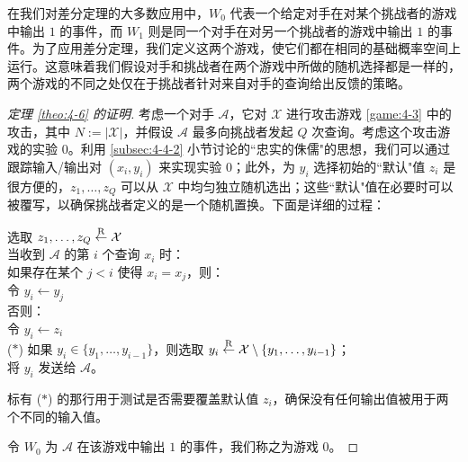 在我们对差分定理的大多数应用中，$W_0$ 代表一个给定对手在对某个挑战者的游戏中输出 $1$ 的事件，而 $W_1$ 则是同一个对手在对另一个挑战者的游戏中输出 $1$ 的事件。为了应用差分定理，我们定义这两个游戏，使它们都在相同的基础概率空间上运行。这意味着我们假设对手和挑战者在两个游戏中所做的随机选择都是一样的，两个游戏的不同之处仅在于挑战者针对来自对手的查询给出反馈的策略。

\begin{proof}[定理 \ref{theo:4-6} 的证明]
考虑一个对手 $\mathcal{A}$，它对 $\mathcal{X}$ 进行攻击游戏 \ref{game:4-3} 中的攻击，其中 $N:=|\mathcal{X}|$，并假设 $\mathcal{A}$ 最多向挑战者发起 $Q$ 次查询。考虑这个攻击游戏的实验 $0$。利用 \ref{subsec:4-4-2} 小节讨论的``忠实的侏儒"的思想，我们可以通过跟踪输入/输出对 $(x_i,y_i)$ 来实现实验 $0$；此外，为 $y_i$ 选择初始的``默认"值 $z_i$ 是很方便的，$z_1,\dots,z_Q$ 可以从 $\mathcal{X}$ 中均匀独立随机选出；这些``默认"值在必要时可以被覆写，以确保挑战者定义的是一个随机置换。下面是详细的过程：

\vspace{5pt}

\hspace*{5pt} 选取 $z_1,\dots,z_Q\overset{\rm R}\leftarrow\mathcal{X}$\\
\hspace*{26pt} 当收到 $\mathcal{A}$ 的第 $i$ 个查询 $x_i$ 时：\\
\hspace*{50pt} 如果存在某个 $j<i$ 使得 $x_i=x_j$，则：\\
\hspace*{75pt} 令 $y_i\leftarrow y_j$\\
\hspace*{50pt} 否则：\\
\hspace*{75pt} 令 $y_i\leftarrow z_i$\\
\hspace*{1pt} ($*$)
\hspace*{53pt} 如果 $y_i\in\{y_1,\dots,y_{i-1}\}$，则选取 $y_i\overset{\rm R}\leftarrow\mathcal{X}\setminus\{y_1,\dots,y_{i-1}\}$；\\
\hspace*{50pt} 将 $y_i$ 发送给 $\mathcal{A}$。

\vspace{5pt}

标有 ($*$) 的那行用于测试是否需要覆盖默认值 $z_i$，确保没有任何输出值被用于两个不同的输入值。

令 $W_0$ 为 $\mathcal{A}$ 在该游戏中输出 $1$ 的事件，我们称之为游戏 $0$。


\end{proof}
